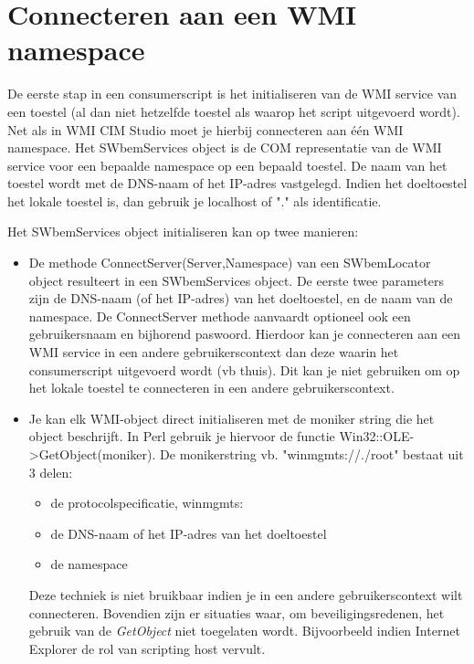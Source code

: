 \documentclass[11pt,a4paper]{report}
\begin{document}
\section{Connecteren aan een WMI namespace}
De eerste stap in een consumerscript is het initialiseren van de WMI service van een toestel (al dan niet hetzelfde toestel als waarop het script uitgevoerd wordt). Net als in WMI CIM Studio moet je hierbij connecteren aan één WMI namespace. Het SWbemServices object is de COM representatie van de WMI service voor een bepaalde namespace op een bepaald toestel. De naam van het toestel wordt met de DNS-naam of het IP-adres vastgelegd. Indien het doeltoestel het lokale toestel is, dan gebruik je localhost of "." als identificatie.
\par Het SWbemServices object initialiseren kan op twee manieren:
\begin{itemize}
	\item De methode ConnectServer(Server,Namespace) van een SWbemLocator object resulteert in een SWbemServices object. De eerste twee parameters zijn de DNS-naam (of het IP-adres) van het doeltoestel, en de naam van de namespace. De ConnectServer methode aanvaardt optioneel ook een gebruikersnaam en bijhorend paswoord. Hierdoor kan je connecteren aan een WMI service in een andere gebruikerscontext dan deze waarin het consumerscript uitgevoerd wordt (vb thuis). Dit kan je niet gebruiken om op het lokale toestel te connecteren in een andere gebruikerscontext.
	\item Je kan elk WMI-object direct initialiseren met de moniker string die het object beschrijft. In Perl gebruik je hiervoor de functie Win32::OLE->GetObject(moniker). De monikerstring vb. "winmgmts://./root" bestaat uit 3 delen:
	\begin{itemize}
		\item de protocolspecificatie, winmgmts:
		\item de DNS-naam of het IP-adres van het doeltoestel
		\item de namespace
	\end{itemize}	
	Deze techniek is niet bruikbaar indien je in een andere gebruikerscontext wilt connecteren.
	Bovendien zijn er situaties waar, om beveiligingsredenen, het gebruik van de \textit{GetObject} niet toegelaten wordt. Bijvoorbeeld indien Internet Explorer de rol van scripting host vervult.
\end{itemize}
\end{document}
